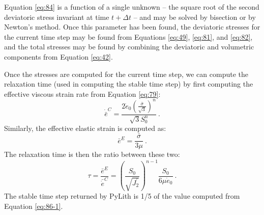 Equation \vref{eq:84} is a function of a single unknown -- the square
root of the second deviatoric stress invariant at time $t+\Delta t$
-- and may be solved by bisection or by Newton's method. Once this
parameter has been found, the deviatoric stresses for the current
time step may be found from Equations \vref{eq:49}, \vref{eq:81},
and \vref{eq:82}, and the total stresses may be found by combining
the deviatoric and volumetric components from Equation \vref{eq:42}.

Once the stresses are computed for the current time step, we can compute
the relaxation time (used in computing the stable time step) by first
computing the effective viscous strain rate from Equation \vref{eq:79}:
\begin{equation}
\dot{\bar{e}}^{C}=\frac{2\dot{e}_{0}\left(\frac{\bar{\sigma}}{\sqrt{3}}\right)^{n}}{\sqrt{3}S_{0}^{n}}\:.
\end{equation}
Similarly, the effective elastic strain is computed as:
\begin{equation}
\bar{e}^{E}=\frac{\bar{\sigma}}{3\mu}\:.
\end{equation}
The relaxation time is then the ratio between these two:
\begin{equation}
\tau=\frac{\bar{e}^{E}}{\bar{\dot{e}}^{C}}=\left(\frac{S_{0}}{\sqrt{J_{2}^{\prime}}}\right)^{n-1}\frac{S_{0}}{6\mu\dot{e}_{0}}\:.\label{eq:86-1}
\end{equation}
The stable time step returned by PyLith is 1/5 of the value computed
from Equation \vref{eq:86-1}.

